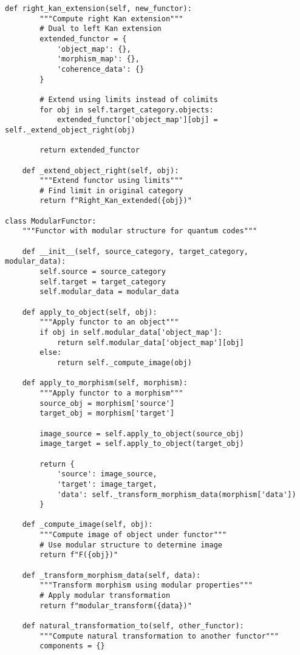 \documentclass[12pt,a4paper]{article}
\begin{document}
\begin{lstlisting}[style=python,caption=Advanced categorical structures for QEC]
    def right_kan_extension(self, new_functor):
        """Compute right Kan extension"""
        # Dual to left Kan extension
        extended_functor = {
            'object_map': {},
            'morphism_map': {},
            'coherence_data': {}
        }
        
        # Extend using limits instead of colimits
        for obj in self.target_category.objects:
            extended_functor['object_map'][obj] = self._extend_object_right(obj)
            
        return extended_functor
        
    def _extend_object_right(self, obj):
        """Extend functor using limits"""
        # Find limit in original category
        return f"Right_Kan_extended({obj})"

class ModularFunctor:
    """Functor with modular structure for quantum codes"""
    
    def __init__(self, source_category, target_category, modular_data):
        self.source = source_category
        self.target = target_category
        self.modular_data = modular_data
        
    def apply_to_object(self, obj):
        """Apply functor to an object"""
        if obj in self.modular_data['object_map']:
            return self.modular_data['object_map'][obj]
        else:
            return self._compute_image(obj)
            
    def apply_to_morphism(self, morphism):
        """Apply functor to a morphism"""
        source_obj = morphism['source']
        target_obj = morphism['target']
        
        image_source = self.apply_to_object(source_obj)
        image_target = self.apply_to_object(target_obj)
        
        return {
            'source': image_source,
            'target': image_target,
            'data': self._transform_morphism_data(morphism['data'])
        }
        
    def _compute_image(self, obj):
        """Compute image of object under functor"""
        # Use modular structure to determine image
        return f"F({obj})"
        
    def _transform_morphism_data(self, data):
        """Transform morphism using modular properties"""
        # Apply modular transformation
        return f"modular_transform({data})"
        
    def natural_transformation_to(self, other_functor):
        """Compute natural transformation to another functor"""
        components = {}
        

\end{lstlisting}
\end{document}

